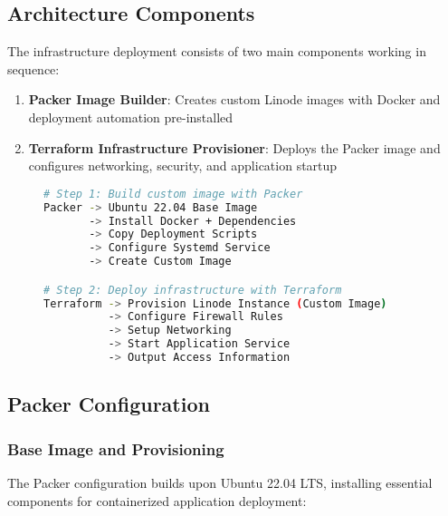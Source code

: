 \documentclass[11pt,a4paper]{article}
\begin{document}
\subsection{Architecture Components}

The infrastructure deployment consists of two main components working in sequence:

\begin{enumerate}
    \item \textbf{Packer Image Builder}: Creates custom Linode images with Docker and deployment automation pre-installed
    \item \textbf{Terraform Infrastructure Provisioner}: Deploys the Packer image and configures networking, security, and application startup
\end{enumerate}

\begin{figure}[H]
\centering
\begin{lstlisting}[language=bash, caption=Infrastructure Deployment Flow]
# Step 1: Build custom image with Packer
Packer -> Ubuntu 22.04 Base Image
       -> Install Docker + Dependencies
       -> Copy Deployment Scripts
       -> Configure Systemd Service
       -> Create Custom Image

# Step 2: Deploy infrastructure with Terraform
Terraform -> Provision Linode Instance (Custom Image)
          -> Configure Firewall Rules
          -> Setup Networking
          -> Start Application Service
          -> Output Access Information
\end{lstlisting}
\end{figure}

\subsection{Packer Configuration}

\subsubsection{Base Image and Provisioning}

The Packer configuration builds upon Ubuntu 22.04 LTS, installing essential components for containerized application deployment:
\end{document}
